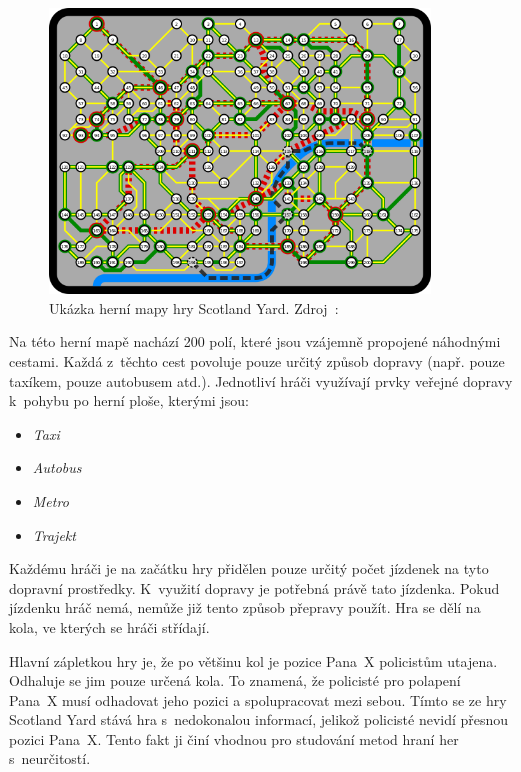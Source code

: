\begin{figure}[H]
	\centering
	\includegraphics[width=0.9\textwidth]{obrazky-figures/scotland_original}
	\caption{Ukázka herní mapy hry Scotland Yard.
  Zdroj~\cite{scotland_original_image}:}\label{fig:figure}
\end{figure}
\newpage

Na této herní mapě nachází 200 polí, které jsou vzájemně propojené náhodnými cestami.
Každá z~těchto cest povoluje pouze určitý způsob dopravy (např. pouze taxíkem, pouze autobusem atd.).
Jednotliví hráči využívají prvky veřejné dopravy k~pohybu po herní ploše, kterými jsou:

\begin{itemize}
  \item \emph{Taxi}\vspace{-0.3cm}
  \item \emph{Autobus}\vspace{-0.3cm}
  \item \emph{Metro}\vspace{-0.3cm}
  \item \emph{Trajekt}\vspace{-0.3cm}
\end{itemize}


Každému hráči je na začátku hry přidělen pouze určitý počet jízdenek na tyto dopravní prostředky.
K~využití dopravy je potřebná právě tato jízdenka.
Pokud jízdenku hráč nemá, nemůže již tento způsob přepravy použít.
Hra se dělí na kola, ve kterých se hráči střídají.

Hlavní zápletkou hry je, že po většinu kol je pozice Pana~X policistům utajena.
Odhaluje se jim pouze určená kola.
To znamená, že policisté pro polapení Pana~X musí odhadovat jeho pozici a spolupracovat mezi sebou.
Tímto se ze hry Scotland Yard stává hra s~nedokonalou informací, jelikož policisté nevidí přesnou pozici Pana~X\@.
Tento fakt ji činí vhodnou pro studování metod hraní her s~neurčitostí.

